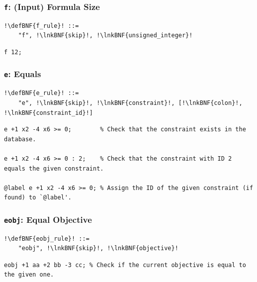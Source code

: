 \documentclass[a4paper]{article}
\newcommand{\defBNF}[1]{\hypertarget{def:#1}{<\detokenize{#1}>}}
\newcommand{\lnkBNF}[1]{\hyperlink{def:#1}{<\detokenize{#1}>}}
\begin{document}
\subsubsection{\texttt{f}: (Input) Formula Size}\label{sec:rules-f}
\begin{lstlisting}
!\defBNF{f_rule}! ::=
	"f", !\lnkBNF{skip}!, !\lnkBNF{unsigned_integer}!
\end{lstlisting}
\begin{lstlisting}[language=veripb]
f 12;
\end{lstlisting}


\subsubsection{\texttt{e}: Equals}\label{sec:rules-e}
\begin{lstlisting}
!\defBNF{e_rule}! ::=
	"e", !\lnkBNF{skip}!, !\lnkBNF{constraint}!, [!\lnkBNF{colon}!, !\lnkBNF{constraint_id}!]
\end{lstlisting}
\begin{lstlisting}[language=veripb]
e +1 x2 -4 x6 >= 0;        % Check that the constraint exists in the database.

e +1 x2 -4 x6 >= 0 : 2;    % Check that the constraint with ID 2 equals the given constraint.

@label e +1 x2 -4 x6 >= 0; % Assign the ID of the given constraint (if found) to `@label'.
\end{lstlisting}


\subsubsection{\texttt{eobj}: Equal Objective}\label{sec:rules-eobj}
\begin{lstlisting}
!\defBNF{eobj_rule}! ::=
	"eobj", !\lnkBNF{skip}!, !\lnkBNF{objective}!
\end{lstlisting}
\begin{lstlisting}[language=veripb]
eobj +1 aa +2 bb -3 cc; % Check if the current objective is equal to the given one.
\end{lstlisting}
\end{document}
